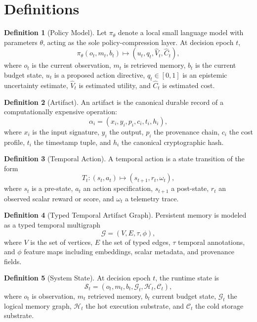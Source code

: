 \documentclass[11pt]{article}
\theoremstyle{definition}
\newtheorem{definition}{Definition}
\newcommand{\hot}{\mathcal{H}}
\newcommand{\cold}{\mathcal{C}}
\newcommand{\graph}{\mathcal{G}}
\newcommand{\state}{\mathcal{S}}
\begin{document}
\section{Definitions}

\begin{definition}[Policy Model]
Let \(\pi_{\theta}\) denote a local small language model with parameters \(\theta\), acting as the sole policy-compression layer. At decision epoch \(t\),
\[
\pi_{\theta}(o_t, m_t, b_t) \mapsto (u_t, q_t, \hat{V}_t, \hat{C}_t),
\]
where \(o_t\) is the current observation, \(m_t\) is retrieved memory, \(b_t\) is the current budget state, \(u_t\) is a proposed action directive, \(q_t \in [0,1]\) is an epistemic uncertainty estimate, \(\hat{V}_t\) is estimated utility, and \(\hat{C}_t\) is estimated cost.
\end{definition}

\begin{definition}[Artifact]
An artifact is the canonical durable record of a computationally expensive operation:
\[
\alpha_i = (x_i, y_i, p_i, c_i, t_i, h_i),
\]
where \(x_i\) is the input signature, \(y_i\) the output, \(p_i\) the provenance chain, \(c_i\) the cost profile, \(t_i\) the timestamp tuple, and \(h_i\) the canonical cryptographic hash.
\end{definition}

\begin{definition}[Temporal Action]
A temporal action is a state transition of the form
\[
T_t : (s_t, a_t) \mapsto (s_{t+1}, r_t, \omega_t),
\]
where \(s_t\) is a pre-state, \(a_t\) an action specification, \(s_{t+1}\) a post-state, \(r_t\) an observed scalar reward or score, and \(\omega_t\) a telemetry trace.
\end{definition}

\begin{definition}[Typed Temporal Artifact Graph]
Persistent memory is modeled as a typed temporal multigraph
\[
\graph = (V, E, \tau, \phi),
\]
where \(V\) is the set of vertices, \(E\) the set of typed edges, \(\tau\) temporal annotations, and \(\phi\) feature maps including embeddings, scalar metadata, and provenance fields.
\end{definition}

\begin{definition}[System State]
At decision epoch \(t\), the runtime state is
\[
\state_t = (o_t, m_t, b_t, \graph_t, \hot_t, \cold_t),
\]
where \(o_t\) is observation, \(m_t\) retrieved memory, \(b_t\) current budget state, \(\graph_t\) the logical memory graph, \(\hot_t\) the hot execution substrate, and \(\cold_t\) the cold storage substrate.
\end{definition}
\end{document}
